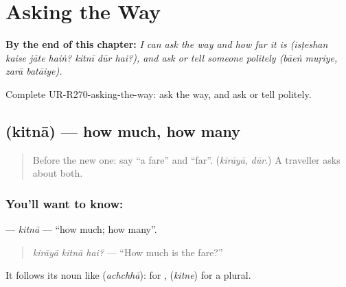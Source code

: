 
\chapter{Asking the Way}
\label{ch:ur-asking-the-way}

\begin{chapteropening}
\textbf{By the end of this chapter:} \emph{I can ask the way and how far it is (isṭeshan kaise jāte haiṅ? kitnī dūr hai?), and ask or tell someone politely (bāeṅ muṛiye, zarā batāiye).}

Complete UR-R270-asking-the-way: ask the way, and ask or tell politely.
\end{chapteropening}

\section[\texorpdfstring{\ur{کتنا} (kitnā)}{کتنا (kitnā)}]{ (kitnā) — how much, how many}

\label{lesson:UR-C270-kitna}



\begin{quote}
Before the new one: say \textquotedblleft{}a fare\textquotedblright{} and \textquotedblleft{}far\textquotedblright{}. (\emph{kirāyā}, \emph{dūr}.) A traveller asks about both.
\end{quote}

\subsection*{You'll want to know: }
\textbf{} — \emph{kitnā} — \textquotedblleft{}how much; how many\textquotedblright{}.

\begin{quote}
\textbf{  }
\end{quote}

\begin{quote}
\emph{kirāyā kitnā hai?} — \textquotedblleft{}How much is the fare?\textquotedblright{}
\end{quote}

It follows its noun like \textbf{} (\emph{achchhā}): \textbf{} for \textbf{}, \textbf{} (\emph{kitne}) for a plural.

